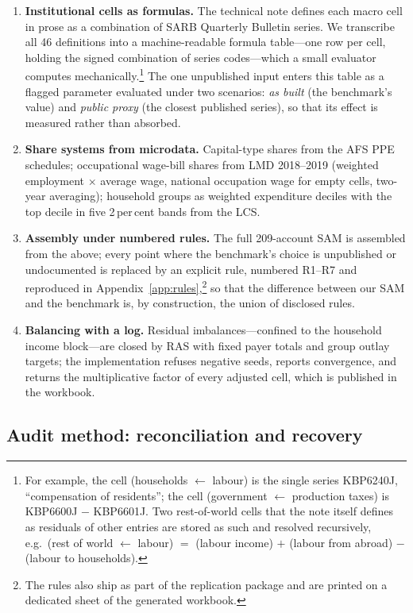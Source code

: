 \begin{enumerate}
  \item \textbf{Institutional cells as formulas.} The technical note
  defines each macro cell in prose as a combination of SARB Quarterly
  Bulletin series. We transcribe all 46 definitions into a machine-readable
  formula table---one row per cell, holding the signed combination of
  series codes---which a small evaluator computes
  mechanically.\footnote{For example, the cell (households $\leftarrow$
  labour) is the single series KBP6240J, ``compensation of residents'';
  the cell (government $\leftarrow$ production taxes) is KBP6600J
  $-$ KBP6601J. Two rest-of-world cells that the note itself defines as
  residuals of other entries are stored as such and resolved recursively,
  e.g.\ (rest of world $\leftarrow$ labour) $=$ (labour income) $+$
  (labour from abroad) $-$ (labour to households).} The one unpublished
  input enters this table as a flagged parameter evaluated under two
  scenarios: \emph{as built} (the benchmark's value) and \emph{public
  proxy} (the closest published series), so that its effect is measured
  rather than absorbed.
  \item \textbf{Share systems from microdata.} Capital-type shares from the
  AFS PPE schedules; occupational wage-bill shares from LMD 2018--2019
  (weighted employment $\times$ average wage, national occupation wage for
  empty cells, two-year averaging); household groups as weighted
  expenditure deciles with the top decile in five 2\,per\,cent bands from
  the LCS.
  \item \textbf{Assembly under numbered rules.} The full 209-account SAM is
  assembled from the above; every point where the benchmark's choice is
  unpublished or undocumented is replaced by an explicit rule, numbered
  R1--R7 and reproduced in Appendix~\ref{app:rules},\footnote{The rules
  also ship as part of the replication package and are printed on a
  dedicated sheet of the generated workbook.} so that the difference
  between our SAM and the benchmark is, by construction, the union of
  disclosed rules.
  \item \textbf{Balancing with a log.} Residual imbalances---confined to
  the household income block---are closed by RAS with fixed payer totals
  and group outlay targets; the implementation refuses negative seeds,
  reports convergence, and returns the multiplicative factor of every
  adjusted cell, which is published in the workbook.
\end{enumerate}

\subsection{Audit method: reconciliation and recovery}

